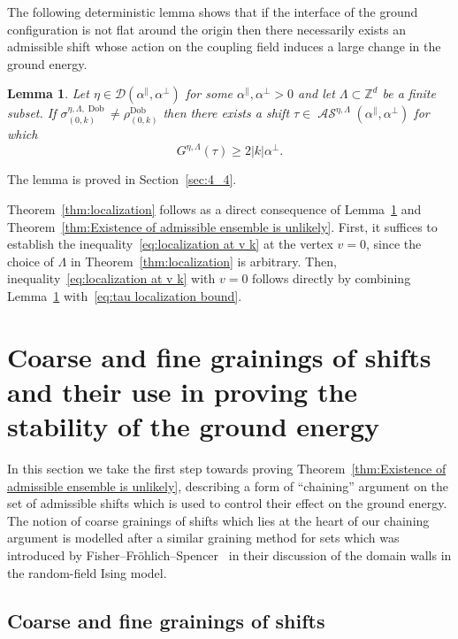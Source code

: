 \documentclass[11pt, reqno]{amsart}
\newtheorem{lemma}[theorem]{Lemma}
\newcommand{\Z}{\mathbb{Z}}
\DeclareMathOperator{\Dob}{Dob}
\DeclareMathOperator{\AS}{\mathcal{AS}}
\numberwithin{equation}{section}
\begin{document}
The following deterministic lemma shows that if the interface of the ground configuration is not flat around the origin then there necessarily exists an admissible shift whose action on the coupling field induces a large change in the ground energy.

\begin{lemma} \label{lem:spin different than sign shift existence}
Let $\eta\in\mathcal{D}(\alpha^{\parallel}, \alpha^{\perp})$ for some  $\alpha^{\parallel}, \alpha^{\perp}>0$
and let $\Lambda \subset \Z^d$ be a finite subset. 
If $\sigma^{\eta,\Lambda,\Dob}_{(0,k)} \neq \rho^{\Dob}_{(0,k)}$ then there exists a shift $\tau\in \AS^{\eta,\Lambda}({\alpha}^{\parallel},{\alpha}^{\perp})$ for which
\begin{equation*}
G^{\eta,\Lambda}(\tau) \geq 2|k| {\alpha}^{\perp}.
\end{equation*}
\end{lemma}

The lemma is proved in Section~\ref{sec:4_4}.

\smallskip
Theorem~\ref{thm:localization} follows as a direct consequence of Lemma~\ref{lem:spin different than sign shift existence} and Theorem~\ref{thm:Existence of admissible ensemble is unlikely}. First, it suffices to establish the inequality~\eqref{eq:localization at v k} at the vertex $v=0$, since the choice of $\Lambda$ in Theorem~\ref{thm:localization} is arbitrary. Then, inequality~\eqref{eq:localization at v k} with $v=0$ follows directly by combining Lemma~\ref{lem:spin different than sign shift existence} with~\eqref{eq:tau localization bound}.

\section{Coarse and fine grainings of shifts and their use in proving the stability of the ground energy}\label{sec:coarse and fine graining}

In this section we take the first step towards proving Theorem~\ref{thm:Existence of admissible ensemble is unlikely}, describing a form of ``chaining'' argument on the set of admissible shifts which is used to control their effect on the ground energy. The notion of coarse grainings of shifts which lies at the heart of our chaining argument is modelled after a similar graining method for sets which was introduced by Fisher--Fr\"ohlich--Spencer~\cite{FFS} in their discussion of the domain walls in the random-field Ising model.

\subsection{Coarse and fine grainings of shifts}\label{sec:coarse and fine grainings}
\end{document}
